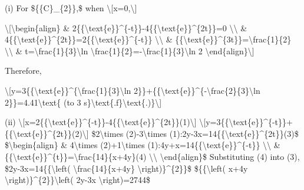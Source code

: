 \item {}

(i) For \$\{\{C\}\_\{2\}\},\$ when \textbackslash{[}x=0,\textbackslash{]}

\textbackslash{[}\textbackslash begin\{align\} \& 2\{\{\textbackslash text\{e\}\}\textasciicircum\{-t\}\}-4\{\{\textbackslash text\{e\}\}\textasciicircum\{2t\}\}=0
\textbackslash\textbackslash{} \& 4\{\{\textbackslash text\{e\}\}\textasciicircum\{2t\}\}=2\{\{\textbackslash text\{e\}\}\textasciicircum\{-t\}\}
\textbackslash\textbackslash{} \& \{\{\textbackslash text\{e\}\}\textasciicircum\{3t\}\}=\textbackslash frac\{1\}\{2\}
\textbackslash\textbackslash{} \& t=\textbackslash frac\{1\}\{3\}\textbackslash ln
\textbackslash frac\{1\}\{2\}=-\textbackslash frac\{1\}\{3\}\textbackslash ln
2 \textbackslash end\{align\}\textbackslash{]}

Therefore,

\textbackslash{[}y=3\{\{\textbackslash text\{e\}\}\textasciicircum\{\textbackslash frac\{1\}\{3\}\textbackslash ln
2\}\}+\{\{\textbackslash text\{e\}\}\textasciicircum\{-\textbackslash frac\{2\}\{3\}\textbackslash ln
2\}\}=4.41\textbackslash text\{ (to 3 s\}\textbackslash text\{.f\}\textbackslash text\{.)\}\textbackslash{]}

(ii) \textbackslash{[}x=2\{\{\textbackslash text\{e\}\}\textasciicircum\{-t\}\}-4\{\{\textbackslash text\{e\}\}\textasciicircum\{2t\}\}(1)\textbackslash{]}
\textbackslash{[}y=3\{\{\textbackslash text\{e\}\}\textasciicircum\{-t\}\}+\{\{\textbackslash text\{e\}\}\textasciicircum\{2t\}\}(2)\textbackslash{]}
\$2\textbackslash times (2)-3\textbackslash times (1):2y-3x=14\{\{\textbackslash text\{e\}\}\textasciicircum\{2t\}\}(3)\$
\$\textbackslash begin\{align\} \& 4\textbackslash times (2)+1\textbackslash times
(1):4y+x=14\{\{\textbackslash text\{e\}\}\textasciicircum\{-t\}\}
\textbackslash\textbackslash{} \& \{\{\textbackslash text\{e\}\}\textasciicircum\{t\}\}=\textbackslash frac\{14\}\{x+4y\}(4)
\textbackslash\textbackslash{} \textbackslash end\{align\}\$ Substituting
(4) into (3), \$2y-3x=14\{\{\textbackslash left( \textbackslash frac\{14\}\{x+4y\}
\textbackslash right)\}\textasciicircum\{2\}\}\$ \$\{\{\textbackslash left(
x+4y \textbackslash right)\}\textasciicircum\{2\}\}\textbackslash left(
2y-3x \textbackslash right)=2744\$